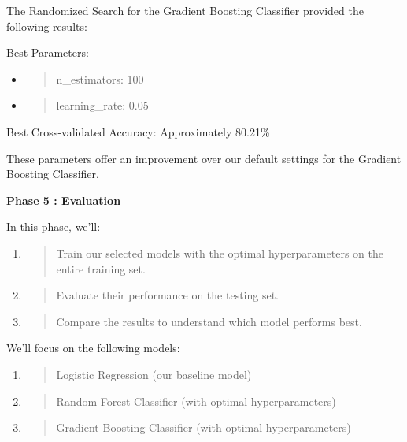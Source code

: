 \documentclass[]{article}
\newcommand{\textcenter}[1]{\begin{center} \vspace{10px}\textbf{\large #1} \end{center}}
\begin{document}
The Randomized Search for the Gradient Boosting Classifier provided the
following results:

Best Parameters:

\begin{itemize}
\item
  \begin{quote}
  n\_estimators: 100
  \end{quote}
\item
  \begin{quote}
  learning\_rate: 0.05
  \end{quote}
\end{itemize}

Best Cross-validated Accuracy: Approximately 80.21\%

These parameters offer an improvement over our default settings for the
Gradient Boosting Classifier.

\textcenter{Phase 5 : Evaluation}

In this phase, we'll:

\begin{enumerate}
\def\labelenumi{\arabic{enumi}.}
\item
  \begin{quote}
  Train our selected models with the optimal hyperparameters on the
  entire training set.
  \end{quote}
\item
  \begin{quote}
  Evaluate their performance on the testing set.
  \end{quote}
\item
  \begin{quote}
  Compare the results to understand which model performs best.
  \end{quote}
\end{enumerate}

We'll focus on the following models:

\begin{enumerate}
\def\labelenumi{\arabic{enumi}.}
\item
  \begin{quote}
  Logistic Regression (our baseline model)
  \end{quote}
\item
  \begin{quote}
  Random Forest Classifier (with optimal hyperparameters)
  \end{quote}
\item
  \begin{quote}
  Gradient Boosting Classifier (with optimal hyperparameters)
  \end{quote}
\end{enumerate}
\end{document}
